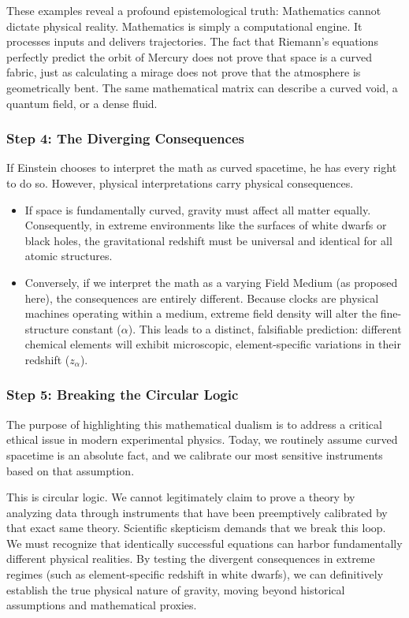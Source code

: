 \documentclass[twocolumn]{article}
\providecommand{\tightlist}{%
  \setlength{\itemsep}{0pt}\setlength{\parskip}{0pt}}
\begin{document}
These examples reveal a profound epistemological truth: Mathematics
cannot dictate physical reality. Mathematics is simply a computational
engine. It processes inputs and delivers trajectories. The fact that
Riemann's equations perfectly predict the orbit of Mercury does not
prove that space is a curved fabric, just as calculating a mirage does
not prove that the atmosphere is geometrically bent. The same
mathematical matrix can describe a curved void, a quantum field, or a
dense fluid.

\subsubsection{Step 4: The Diverging
Consequences}\label{step-4-the-diverging-consequences}

If Einstein chooses to interpret the math as curved spacetime, he has
every right to do so. However, physical interpretations carry physical
consequences.

\begin{itemize}
\tightlist
\item
  If space is fundamentally curved, gravity must affect all matter
  equally. Consequently, in extreme environments like the surfaces of
  white dwarfs or black holes, the gravitational redshift must be
  universal and identical for all atomic structures.
\item
  Conversely, if we interpret the math as a varying Field Medium (as
  proposed here), the consequences are entirely different. Because
  clocks are physical machines operating within a medium, extreme field
  density will alter the fine-structure constant (\(\alpha\)). This
  leads to a distinct, falsifiable prediction: different chemical
  elements will exhibit microscopic, element-specific variations in
  their redshift (\(z_\alpha\)).
\end{itemize}

\subsubsection{Step 5: Breaking the Circular
Logic}\label{step-5-breaking-the-circular-logic}

The purpose of highlighting this mathematical dualism is to address a
critical ethical issue in modern experimental physics. Today, we
routinely assume curved spacetime is an absolute fact, and we calibrate
our most sensitive instruments based on that assumption.

This is circular logic. We cannot legitimately claim to prove a theory
by analyzing data through instruments that have been preemptively
calibrated by that exact same theory. Scientific skepticism demands that
we break this loop. We must recognize that identically successful
equations can harbor fundamentally different physical realities. By
testing the divergent consequences in extreme regimes (such as
element-specific redshift in white dwarfs), we can definitively
establish the true physical nature of gravity, moving beyond historical
assumptions and mathematical proxies.
\end{document}
